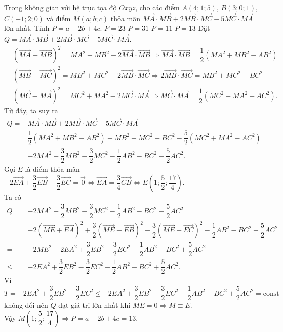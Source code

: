 \begin{ex}%
	Trong không gian với hệ trục tọa độ $Oxyz$, cho các điểm $A(4;1;5)$, $B(3;0;1)$, $C(-1;2;0)$ và điểm $ M(a;b;c)$ thỏa mãn $\overrightarrow{MA}\cdot\overrightarrow{MB}+2\overrightarrow{MB}\cdot\overrightarrow{MC}-5\overrightarrow{MC}\cdot\overrightarrow{MA}$ lớn nhất. Tính $P=a-2b+4c$.
	\choice
	{$P=23$}
	{$P=31$}
	{$P=11$}
	{\True $P=13$}
	\loigiai
{Đặt  $Q=\overrightarrow{MA}\cdot\overrightarrow{MB}+2\overrightarrow{MB}\cdot\overrightarrow{MC}-5\overrightarrow{MC}\cdot\overrightarrow{MA}$.
	\begin{align*}	&\left(\overrightarrow{MA}-\overrightarrow{MB}\right)^2=MA^2+MB^2-2\overrightarrow{MA}\cdot\overrightarrow{MB}\Rightarrow\overrightarrow{MA}\cdot\overrightarrow{MB}=\dfrac{1}{2}\left(MA^2+MB^2-AB^2\right)\\		&\left(\overrightarrow{MB}-\overrightarrow{MC}\right)^2=MB^2+MC^2-2\overrightarrow{MB}\cdot\overrightarrow{MC}\Rightarrow 2\overrightarrow{MB}\cdot\overrightarrow{MC}=MB^2+MC^2-BC^2\\
	&\left(\overrightarrow{MC}-\overrightarrow{MA}\right)^2=MC^2+MA^2-2\overrightarrow{MC}\cdot\overrightarrow{MA}\Rightarrow\overrightarrow{MC}\cdot\overrightarrow{MA}=\dfrac{1}{2}\left(MC^2+MA^2-AC^2\right).\end{align*}
Từ đây, ta suy ra 
\begin{align*} Q=&\overrightarrow{MA}\cdot\overrightarrow{MB}+2\overrightarrow{MB}\cdot\overrightarrow{MC}-5\overrightarrow{MC}\cdot\overrightarrow{MA}\\
 =&\dfrac{1}{2}\left(MA^2+MB^2-AB^2\right)+MB^2+MC^2-BC^2-\dfrac{5}{2}\left(MC^2+MA^2-AC^2\right)\\ =&-2MA^2+\dfrac{3}{2}MB^2-\dfrac{3}{2}MC^2-\dfrac{1}{2}AB^2-BC^2+\dfrac{5}{2}AC^2.\end{align*}
Gọi $ E$ là điểm thỏa mãn $-2\overrightarrow{EA}+\dfrac{3}{2}\overrightarrow{EB}-\dfrac{3}{2}\overrightarrow{EC}=\overrightarrow{0}\Leftrightarrow\overrightarrow{EA}=\dfrac{3}{4}\overrightarrow{CB}\Leftrightarrow E\left(1;\dfrac{5}{2};\dfrac{17}{4}\right)$.\\

Ta có 
\begin{align*} Q=&-2MA^2+\dfrac{3}{2}MB^2-\dfrac{3}{2}MC^2-\dfrac{1}{2}AB^2-BC^2+\dfrac{5}{2}AC^2\\
	=&-2\left(\overrightarrow{ME}+\overrightarrow{EA}\right)^2+\dfrac{3}{2}\left(\overrightarrow{ME}+\overrightarrow{EB}\right)^2-\dfrac{3}{2}\left(\overrightarrow{ME}+\overrightarrow{EC}\right)^2-\dfrac{1}{2}AB^2-BC^2+\dfrac{5}{2}AC^2\\
	=&-2ME^2-2EA^2+\dfrac{3}{2}EB^2-\dfrac{3}{2}EC^2-\dfrac{1}{2}AB^2-BC^2+\dfrac{5}{2}AC^2\\
	\leq&-2EA^2+\dfrac{3}{2}EB^2-\dfrac{3}{2}EC^2-\dfrac{1}{2}AB^2-BC^2+\dfrac{5}{2}AC^2.
\end{align*}
Vì $T=-2EA^2+\dfrac{3}{2}EB^2-\dfrac{3}{2}EC^2\le-2EA^2+\dfrac{3}{2}EB^2-\dfrac{3}{2}EC^2-\dfrac{1}{2}AB^2-BC^2+\dfrac{5}{2}AC^2=\text{const}$ không đổi nên $Q$ đạt giá trị lớn nhất khi $ME=0\Rightarrow M\equiv E$.\\
Vậy $M\left(1;\dfrac{5}{2};\dfrac{17}{4}\right)\Rightarrow P=a-2b+4c=13$.}
\end{ex}

